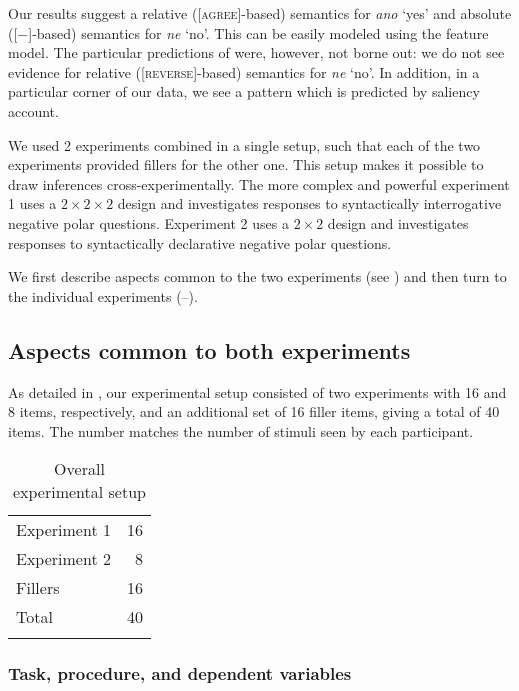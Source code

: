 \documentclass[output=paper,colorlinks,citecolor=brown]{langscibook}
\begin{document}
Our results suggest a relative ([\textsc{agree}]-based) semantics for \textit{ano} `yes' and absolute ([$-$]-based) semantics for \textit{ne} `no'. This can be easily modeled using the feature model. The particular predictions of \citet{gruet2016yes} were, however, not borne out: we do not see evidence for relative ([\textsc{reverse}]-based) semantics for \textit{ne} `no'. In addition, in a particular corner of our data, we see a pattern which is predicted by  saliency account.

We used 2 experiments combined in a single setup, such that each of the two experiments provided fillers for the other one. This setup makes it possible to draw inferences cross-experimentally. The more complex and powerful experiment 1 uses a $2\times 2\times 2$ design and investigates responses to syntactically interrogative negative polar questions. Experiment 2 uses a $2\times 2$ design and investigates responses to syntactically declarative negative polar questions.

We first describe aspects common to the two experiments (see ) and then turn to the individual experiments (--).

\subsection{Aspects common to both experiments} \label{hrdsim:sec:method}

As detailed in , our experimental setup consisted of two experiments with 16 and 8 items, respectively, and an additional set of 16 filler items, giving a total of 40 items. The number matches the number of stimuli seen by each participant.

\begin{table}%
\begin{tabular}{lr}
\lsptoprule
Experiment 1 & 16 \\ [0.4em]
Experiment 2 & 8\\ [0.4em]
Fillers & 16\\ [0.4em]
Total & 40\\
\lspbottomrule
\end{tabular}
    \caption{Overall experimental setup}
    \label{hrdsim:tab:exp.over}
\end{table}

\subsubsection{Task, procedure, and dependent variables}
\end{document}
